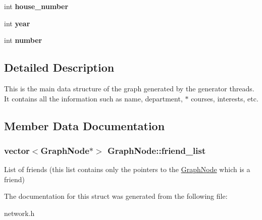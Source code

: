 \begin{DoxyCompactItemize}
\item 
\hypertarget{structGraphNode_a1099487bfb5aaa5bee1d0c7a4131b938}{int {\bfseries house\-\_\-number}}\label{structGraphNode_a1099487bfb5aaa5bee1d0c7a4131b938}

\item 
\hypertarget{structGraphNode_a5355974d7deb6252207f8b990588417b}{int {\bfseries year}}\label{structGraphNode_a5355974d7deb6252207f8b990588417b}

\item 
\hypertarget{structGraphNode_a094724105a443ea69ba95d0d98356f93}{int {\bfseries number}}\label{structGraphNode_a094724105a443ea69ba95d0d98356f93}

\end{DoxyCompactItemize}


\subsection{\-Detailed \-Description}
\-This is the main data structure of the graph generated by the generator threads. \-It contains all the information such as name, department, $\ast$ courses, interests, etc. 

\subsection{\-Member \-Data \-Documentation}
\hypertarget{structGraphNode_a3ffe69b1e0d4df5a623e9b4601e8ce01}{
\subsubsection[{friend\-\_\-list}]{\setlength{\rightskip}{0pt plus 5cm}vector$<${\bf \-Graph\-Node}$\ast$$>$ {\bf \-Graph\-Node\-::friend\-\_\-list}}}\label{structGraphNode_a3ffe69b1e0d4df5a623e9b4601e8ce01}
\-List of friends (this list contains only the pointers to the \hyperlink{structGraphNode}{\-Graph\-Node} which is a friend) 

\-The documentation for this struct was generated from the following file\-:\begin{DoxyCompactItemize}
\item 
network.\-h\end{DoxyCompactItemize}
